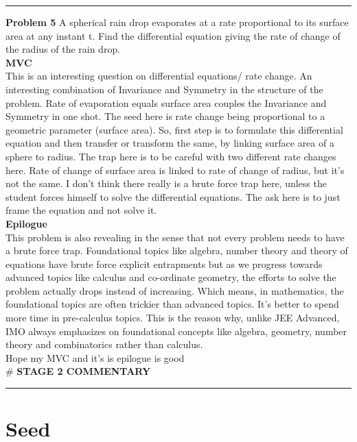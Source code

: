 \documentclass{article}
\begin{document}
\noindent \rule{\textwidth}{0.4pt}

\noindent \textbf{Problem 5} A spherical rain drop evaporates at a rate proportional to its surface area at any instant t. Find the differential equation giving the rate of change of the radius of the rain drop. \\

\noindent \textbf{MVC} \\
This is an interesting question on differential equations/ rate change. An interesting combination of Invariance and Symmetry in the structure of the problem. Rate of evaporation equals surface area couples the Invariance and Symmetry in one shot. The seed here is rate change being proportional to a geometric parameter (surface area). So, first step is to formulate this differential equation and then transfer or transform the same, by linking surface area of a sphere to radius. The trap here is to be careful with two different rate changes here. Rate of change of surface area is linked to rate of change of radius, but it's not the same. I don't think there really is a brute force trap here, unless the student forces himself to solve the differential equations. The ask here is to just frame the equation and not solve it. \\

\noindent \textbf{Epilogue} \\
This problem is also revealing in the sense that not every problem needs to have a brute force trap. Foundational topics like algebra, number theory and theory of equations have brute force explicit entrapments but as we progress towards advanced topics like calculus and co-ordinate geometry, the efforts to solve the problem actually drops instead of increasing. Which means, in mathematics, the foundational topics are often trickier than advanced topics. It's better to spend more time in pre-calculus topics. This is the reason why, unlike JEE Advanced, IMO always emphasizes on foundational concepts like algebra, geometry, number theory and combinatorics rather than calculus. \\

\noindent Hope my MVC and it's is epilogue is good \\

\noindent \# \textbf{STAGE 2 COMMENTARY} \\
\noindent \rule{\textwidth}{0.4pt}

\section*{Seed}
\end{document}
